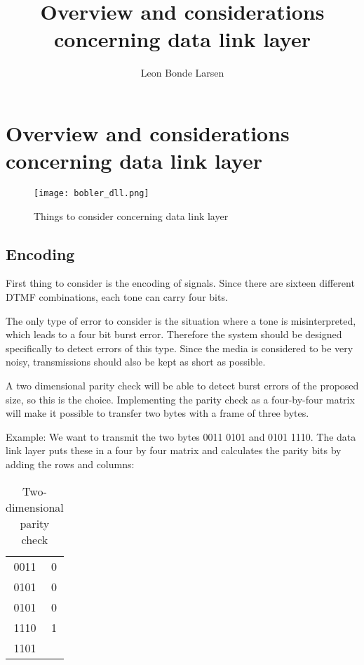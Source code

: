 \documentclass[letterpaper]{article}
\author{Leon Bonde Larsen}
\title{Overview and considerations concerning data link layer}
\begin{document}
\setlength{\baselineskip}{1.6\baselineskip}
\setlength{\parskip}{2ex}
\maketitle

\section{Overview and considerations concerning data link layer}

\begin{figure}[htb]
	\begin{center}
	\texttt{[image: bobler\_dll.png]} %
	\caption{Things to consider concerning data link layer}
	\label{Things to consider concerning data link layer}			%
	\end{center}
\end{figure}

\subsection{Encoding}
First thing to consider is the encoding of signals. Since there are sixteen
different DTMF combinations, each tone can carry four bits.

The only type of error to consider is the situation where a tone is
misinterpreted, which leads to a four bit burst error. Therefore the system
should be designed specifically to detect errors of this type. Since the media
is considered to be very noisy, transmissions should also be kept as short as
possible.

A two dimensional parity check will be able to detect burst errors of the
proposed size, so this is the choice. Implementing the parity check as a
four-by-four matrix will make it possible to transfer two bytes with a frame of
three bytes.

Example: We want to transmit the two bytes 0011 0101 and 0101 1110. The data
link layer puts these in a four by four matrix and calculates the parity bits by
adding the rows and columns:


\begin{table}[htb]
	\begin{center}
	\begin{tabular}{c|c}
	0011 & 0 \\
	0101 & 0 \\
	0101 & 0 \\
	1110 & 1 \\
	\hline
	1101 & \\
	\end{tabular}
	\end{center}
	\caption{Two-dimensional parity check}
	\label{tab:Two-dimensional parity check}
\end{table}
\end{document}

